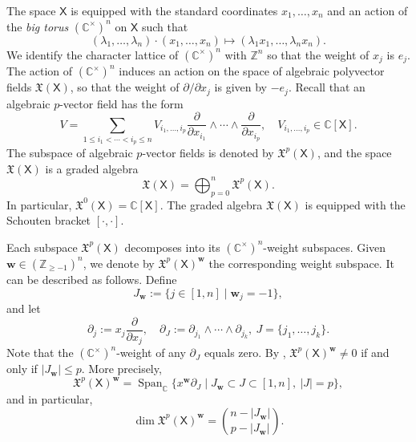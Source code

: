 \documentclass[11pt]{article}
\newcommand{\bw}{\mathbf{w}}
\DeclareMathOperator{\Span}{Span}
\theoremstyle{definition}\newtheorem{definition}[theorem]{Definition}
\theoremstyle{definition}\newtheorem{remark}[theorem]{Remark}
\theoremstyle{remark}
\numberwithin{equation}{section}
\begin{document}
The space $\mathsf{X}$ is equipped with the standard coordinates $x_1,\ldots,x_n$ and an action of the \emph{big torus} $(\mathbb{C}^\times)^n$ on $\mathsf{X}$ such that
\begin{equation*}
    (\lambda_1,\ldots,\lambda_n)\cdot (x_1,\ldots,x_n) \mapsto (\lambda_1 x_1,\ldots,\lambda_n x_n).
\end{equation*}
We identify the character lattice of $(\mathbb{C}^\times)^n$ with $\mathbb{Z}^n$ so that the weight of $x_j$ is $e_j$.
The action of $(\mathbb{C}^\times)^n$ induces an action on the space of algebraic polyvector fields $\mathfrak{X}(\mathsf{X})$, so that the weight of $\partial/\partial x_j$ is given by $-e_j$. Recall that an algebraic $p$-vector field has the form
\begin{equation*}
    V = \sum_{1 \leq i_1 < \cdots < i_p \leq n} V_{i_1,\ldots,i_p} \frac{\partial}{\partial x_{i_1}}\wedge \cdots \wedge \frac{\partial}{\partial x_{i_p}}, \quad V_{i_1,\ldots,i_p} \in \mathbb{C}[\mathsf{X}].
\end{equation*}
The subspace of algebraic $p$-vector fields is denoted by $\mathfrak{X}^p(\mathsf{X})$, and the space $\mathfrak{X}(\mathsf{X})$ is a graded algebra
\begin{equation*}
    \mathfrak{X}(\mathsf{X}) = \bigoplus_{p=0}^n \mathfrak{X}^p(\mathsf{X}).
\end{equation*}
In particular, $\mathfrak{X}^0(\mathsf{X}) = \mathbb{C}[\mathsf{X}]$. The graded algebra $\mathfrak{X}(\mathsf{X})$ is equipped with the Schouten bracket $[\cdot,\cdot]$.

Each subspace $\mathfrak{X}^p(\mathsf{X})$ decomposes into its $(\mathbb{C}^\times)^n$-weight subspaces. Given $\bw \in (\mathbb{Z}_{\geq -1})^n$, we denote by $\mathfrak{X}^p(\mathsf{X})^{\bw}$ the corresponding weight subspace. It can be described as follows. Define
\begin{equation*}
    J_{\bw} := \{j \in [1,n] \mid \bw_j = -1\},
\end{equation*}
and let
\begin{equation*}
    \partial_j := x_j \frac{\partial}{\partial x_j}, \quad \partial_J := \partial_{j_1} \wedge \cdots \wedge \partial_{j_k}, \ J = \{j_1,\ldots,j_k\}.
\end{equation*}
Note that the $(\mathbb{C}^\times)^n$-weight of any $\partial_J$ equals zero.
By \cite[Lemma 2.1.1]{lm-deform}, $\mathfrak{X}^p(\mathsf{X})^{\bw} \neq 0$ if and only if $|J_{\bw}|\leq p$. More precisely, 
\begin{equation}\label{eq:xpw}
    \mathfrak{X}^p(\mathsf{X})^{\bw} = \Span_{\mathbb{C}}\{ x^{\bw} \partial_J \mid J_{\bw} \subset J \subset [1,n], \ |J| = p\},
\end{equation}
and in particular, 
\begin{equation*}
    \dim \mathfrak{X}^p(\mathsf{X})^{\bw} = \binom{n-|J_{\bw}|}{p-|J_{\bw}|}.
\end{equation*}
\end{document}
